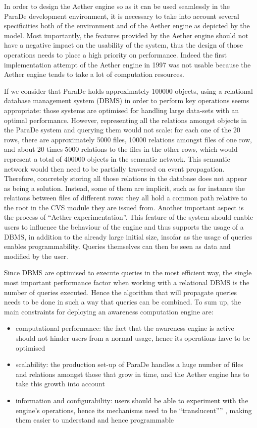 \documentclass{ecscw2007}
\begin{document}
In order to design the Aether engine so as it can be used seamlessly in the ParaDe development environment, it is necessary to take into account several specificities both of the environment and of the Aether engine as depicted by the model.
Most importantly, the features provided by the Aether engine should not have a negative impact on the usability of the system, thus the design of those operations needs to place a high priority on performance. Indeed the first implementation attempt of the Aether engine in 1997 was not usable because the Aether engine tends to take a lot of computation resources.

If we consider that ParaDe holds approximately 100000 objects, using a relational database management system (DBMS) in order to perform key operations seems appropriate: those systems are optimised for handling large data-sets with an optimal performance. However, representing all the relations amongst objects in the ParaDe system and querying them would not scale: for each one of the 20 rows, there are approximately 5000 files, 10000 relations amongst files of one row, and about 20 times 5000 relations to the files in the other rows, which would represent a total of 400000 objects in the semantic network. This semantic network would then need to be partially traversed on event propagation. Therefore, concretely storing all those relations in the database does not appear as being a solution. Instead, some of them are implicit, such as for instance the relations between files of different rows: they all hold a common path relative to the root in the CVS module they are issued from.
Another important aspect is the process of ``Aether experimentation''. This feature of the system should enable users to influence the behaviour of the engine and thus supports the usage of a DBMS, in addition to the already large initial size, insofar as the usage of queries enables programmability. Queries themselves can then be seen as data and modified by the user.

Since DBMS are optimised to execute queries in the most efficient way, the single most important performance factor when working with a relational DBMS is the number of queries executed. Hence the algorithm that will propagate queries needs to be done in such a way that queries can be combined.
To sum up, the main constraints for deploying an awareness computation engine are:
\begin{itemize}
     \item computational performance: the fact that the awareness engine is active should not hinder users from a normal usage, hence its operations have to be optimised
     \item scalability: the production set-up of ParaDe handles a huge number of files and relations amongst those that grow in time, and the Aether engine has to take this growth into account
     \item information and configurability: users should be able to experiment with the engine’s operations, hence its mechanisms need to be ``translucent'''' , making them easier to understand and hence programmable
\end{itemize}
\end{document}
